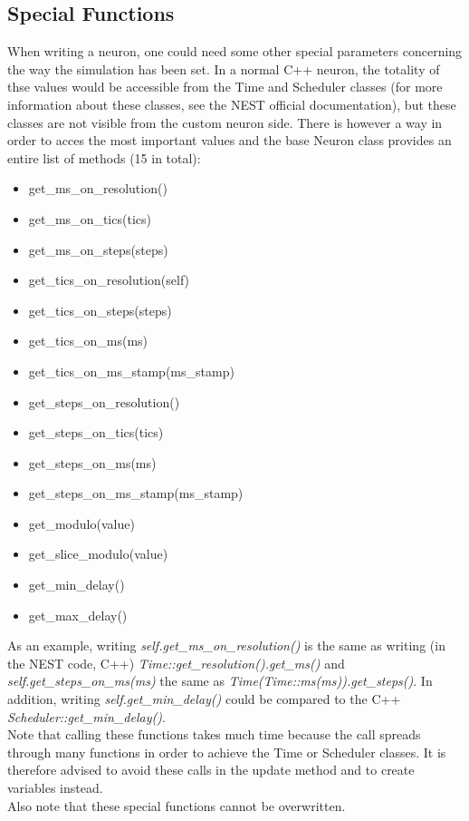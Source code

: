 \documentclass{article}
\begin{document}
\subsection*{Special Functions}
When writing a neuron, one could need some other special parameters concerning the way the simulation has been set. In a normal C++ neuron, the totality of thse values would be accessible from the Time and Scheduler classes (for more information about these classes, see the NEST official documentation), but these classes are not visible from the custom neuron side. 
There is however a way in order to acces the most important values and the base Neuron class provides an entire list of methods (15 in total):
\begin{itemize}
\item get\_ms\_on\_resolution()

\item get\_ms\_on\_tics(tics)

\item get\_ms\_on\_steps(steps)

\item get\_tics\_on\_resolution(self)

\item get\_tics\_on\_steps(steps)

\item get\_tics\_on\_ms(ms)
   
\item get\_tics\_on\_ms\_stamp(ms\_stamp)

\item get\_steps\_on\_resolution()

\item get\_steps\_on\_tics(tics)

\item get\_steps\_on\_ms(ms)

\item get\_steps\_on\_ms\_stamp(ms\_stamp)

\item get\_modulo(value)

\item get\_slice\_modulo(value)

\item get\_min\_delay()

\item get\_max\_delay()

\end{itemize}

As an example, writing \emph{self.get\_ms\_on\_resolution()} is the same as writing (in the NEST code, C++) \emph{Time::get\_resolution().get\_ms()} and \emph{self.get\_steps\_on\_ms(ms)} the same as \emph{Time(Time::ms(ms)).get\_steps()}. In addition, writing \emph{self.get\_min\_delay()} could be compared to the C++ \emph{Scheduler::get\_min\_delay()}.\\
Note that calling these functions takes much time because the call spreads through many functions in order to achieve the Time or Scheduler classes. It is therefore advised to avoid these calls in the update method and to create variables instead.\\
Also note that these special functions cannot be overwritten.
\end{document}
